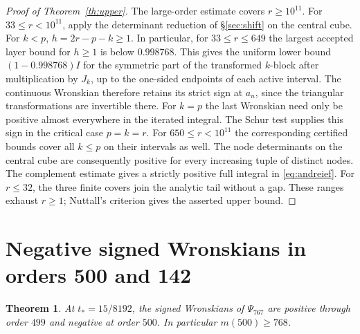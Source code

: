 \documentclass[11pt,a4paper,reqno]{amsart}
\newtheorem{theorem}{Theorem}[section]
\numberwithin{equation}{section}
\begin{document}
\begin{proof}[Proof of Theorem~\ref{th:upper}]
The large-order estimate covers \(r\ge10^{11}\). For \(33\le r<10^{11}\), apply the determinant reduction of \S\ref{sec:shift} on the central cube. For \(k<p\), \(h=2r-p-k\ge1\). In particular, for \(33\le r\le649\) the largest accepted layer bound for \(h\ge1\) is below \(0.998768\). This gives the uniform lower bound \((1-0.998768)I\) for the symmetric part of the transformed \(k\)-block after multiplication by \(J_k\), up to the one-sided endpoints of each active interval. The continuous Wronskian therefore retains its strict sign at \(a_n\), since the triangular transformations are invertible there. For \(k=p\) the last Wronskian need only be positive almost everywhere in the iterated integral. The Schur test supplies this sign in the critical case \(p=k=r\). For \(650\le r<10^{11}\) the corresponding certified bounds cover all \(k\le p\) on their intervals as well. The node determinants on the central cube are consequently positive for every increasing tuple of distinct nodes. The complement estimate gives a strictly positive full integral in \eqref{eq:andreief}. For \(r\le32\), the three finite covers join the analytic tail without a gap. These ranges exhaust \(r\ge1\); Nuttall's criterion gives the asserted upper bound.
\end{proof}


\section{Negative signed Wronskians in orders 500 and 142}\label{sec:witness}


\begin{theorem}\label{th:witness}
At \(t_*=15/8192\), the signed Wronskians of \(\Psi_{767}\) are positive through order \(499\) and negative at order \(500\). In particular \(m(500)\ge768\).
\end{theorem}
\end{document}
